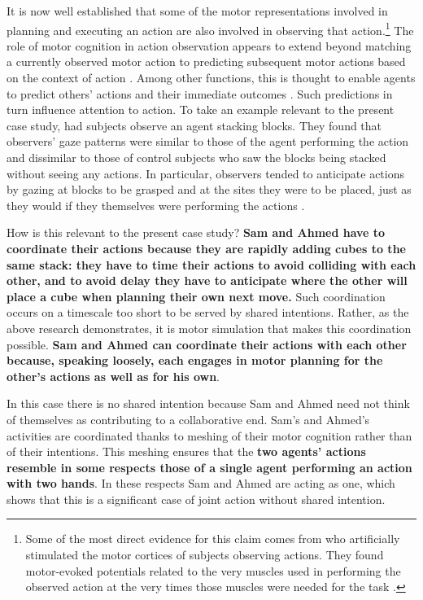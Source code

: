 \documentclass[14pt,a4paper]{extarticle}
\begin{document}
It is now well established that some of the motor representations involved in planning and executing an action are also involved in observing that action.\footnote{
Some of the most direct evidence for this claim comes from \citet{Gangitano:2001ft} who artificially stimulated the motor cortices of subjects observing actions.  They found motor-evoked potentials related to the very muscles used in performing the observed action at the very times those muscles were needed for the task \citep[see further][]{Fadiga:2005gq}.  
}
The role of motor cognition in action observation appears to extend beyond matching a currently observed motor action to predicting subsequent motor actions based on the context of action \citep[e.g.][]{Iacoboni:2005ww,hamilton_action_2008}.  Among other functions, this is thought to enable agents to predict others' actions and their immediate outcomes \citep{Wolpert:2003mg,Wilson:2005qu}.  Such predictions in turn influence attention to action.  To take an example relevant to the present case study, \citet{Flanagan:2003lm} had subjects observe an agent stacking blocks.  They found that observers' gaze patterns were similar to those of the agent performing the action and dissimilar to those of control subjects who saw the blocks being stacked without seeing any actions.  In particular, observers tended to anticipate actions by gazing at blocks to be grasped and at the sites they were to be placed, just as they would if they themselves were performing the actions \citep[see further][]{Rotman:2006xf}.  

How is this relevant to the present case study?  \textbf{Sam and Ahmed have to coordinate their actions because they are rapidly adding cubes to the same stack: they have to time their actions to avoid colliding with each other, and to avoid delay they have to anticipate where the other will place a cube when planning their own next move.}  Such coordination occurs on a timescale too short to be served by shared intentions.  Rather, as the above research demonstrates, it is motor simulation that makes this coordination possible.  \textbf{Sam and Ahmed can coordinate their actions with each other because, speaking loosely, each engages in motor planning for the other's actions as well as for his own}.  

In this case there is no shared intention because Sam and Ahmed need not think of themselves as contributing to a collaborative end.  Sam's and Ahmed's activities are coordinated thanks to meshing of their motor cognition rather than of their intentions.  This meshing ensures that the \textbf{two agents' actions resemble in some respects those of a single agent performing an action with two hands}.  In these respects Sam and Ahmed are acting as one, which shows that this is a significant case of joint action without shared intention.  
\end{document}
